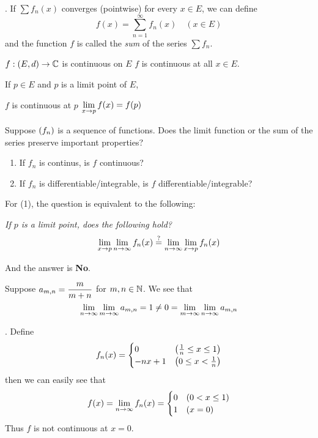 . If \(\sum f_n(x)\) converges (pointwise) for every \(x \in E\), we can define
\[
    f(x) = \sum_{n=1}^\infty f_n(x) \quad (x \in E)
\]
and the function \(f\) is called the \textit{sum} of the series \(\sum f_n\).

\recall \(f: (E, d) \rightarrow \mathbb{C}\) is continuous on \(E\) \miff \(f\) is continuous at all \(x \in E\).

\recall {} If \(p \in E\) and \(p\) is a limit point of \(E\),
\begin{center}
    \(f\) is continuous at \(p\) \miff \(\displaystyle \lim_{x \rightarrow p} f(x) = f(p)\)
\end{center}

\question Suppose \(\left( f_n \right)\) is a sequence of functions. Does the limit function or the sum of the series preserve important properties?
\begin{enumerate}
    \item If \(f_n\) is continus, is \(f\) continuous?
    \item If \(f_n\) is differentiable/integrable, is \(f\) differentiable/integrable?
\end{enumerate}

For (1), the question is equivalent to the following:

\textit{If \(p\) is a limit point, does the following hold?}
\[
    \lim_{x\rightarrow p} \lim_{n\rightarrow \infty} f_n(x) \overset{?}{=} \lim_{n\rightarrow \infty} \lim_{x\rightarrow p}f_n(x)
\]

And the answer is \textbf{No}.

 Suppose \(\displaystyle a_{m, n} = \frac{m}{m + n}\) for \(m, n\in \mathbb{N}\). We see that
\[
    \lim_{n \rightarrow \infty} \lim_{m \rightarrow \infty} a_{m, n} = 1 \neq 0 = \lim_{m \rightarrow \infty} \lim_{n \rightarrow \infty} a_{m, n}
\]

\ex. Define
\[
    f_n(x) = \begin{cases}
        0       & \left( \frac{1}{n} \leq x \leq 1 \right) \\
        -nx + 1 & \left( 0 \leq x < \frac{1}{n} \right)
    \end{cases}
\]
then we can easily see that
\[
    f(x) = \lim_{n\rightarrow \infty} f_n(x) = \begin{cases}
        0 & (0 < x \leq 1) \\
        1 & (x = 0)
    \end{cases}
\]
Thus \(f\) is not continuous at \(x = 0\).


